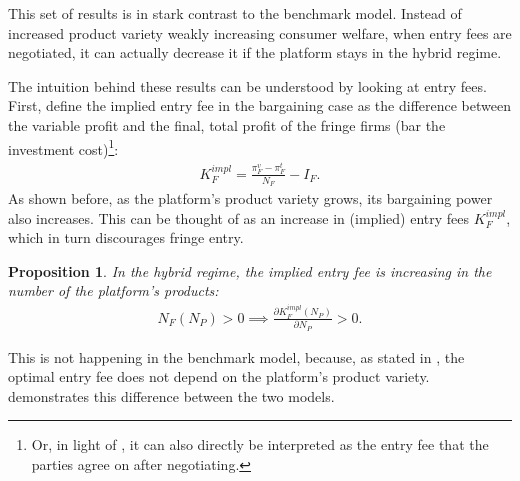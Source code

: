 \documentclass[a4paper]{article}
\newtheorem{proposition}{Proposition}
\begin{document}
This set of results is in stark contrast to the benchmark model.
Instead of increased product variety weakly increasing consumer welfare, when entry fees are negotiated, it can actually decrease it if the platform stays in the hybrid regime.

The intuition behind these results can be understood by looking at entry fees.
First, define the implied entry fee in the bargaining case as the difference between the variable profit and the final, total profit of the fringe firms (bar the investment cost)\footnote{
    Or, in light of , it can also directly be interpreted as the entry fee that the parties agree on after negotiating.
}:
\begin{align*}
    K_F^{impl} = \frac{\pi_F^v - \pi_F^t}{N_F} - I_F.
\end{align*}
As shown before, as the platform's product variety grows, its bargaining power also increases.
This can be thought of as an increase in (implied) entry fees $K_F^{impl}$, which in turn discourages fringe entry.
\begin{proposition}
    \label{prop:implied_entry_fee_comparative}
    In the hybrid regime, the implied entry fee is increasing in the number of the platform's products:
    \begin{align*}
        N_F(N_P) > 0 \implies \frac{\partial K_F^{impl}(N_P)}{\partial N_P} > 0.
    \end{align*}
\end{proposition}
This is not happening in the benchmark model, because, as stated in , the optimal entry fee does not depend on the platform's product variety.
 demonstrates this difference between the two models.
\end{document}
